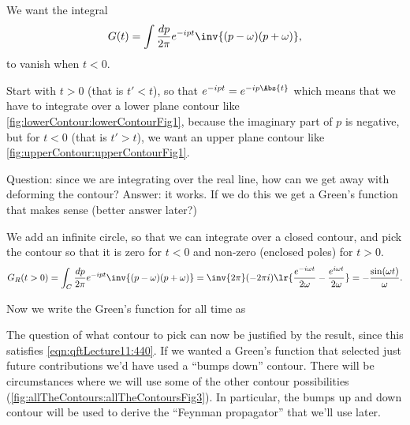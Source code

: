 We want the integral
\begin{equation}\label{eqn:qftLecture11:620}
G(t)
= \int \frac{dp}{2 \pi} e^{-i p t}
\inv{(p - \omega)(p + \omega)},
\end{equation}
to vanish when \( t < 0 \).

Start with \( t > 0 \) (that is \( t' < t \)), so that \( e^{-i p t} = e^{-i p \Abs{t}} \) which means that we have to integrate over a lower plane contour like \cref{fig:lowerContour:lowerContourFig1}, because the imaginary part of \( p \) is negative, but for \( t < 0 \) (that is \( t' > t \)), we want an upper plane contour like \cref{fig:upperContour:upperContourFig1}.


Question: since we are integrating over the real line, how can we get away with deforming the contour?
Answer: it works.  If we do this we get a Green's function that makes sense (better answer later?)

We add an infinite circle, so that we can integrate over a closed contour, and pick the contour so that it is zero for \( t < 0 \) and non-zero (enclosed poles) for \( t > 0 \).
\begin{equation}\label{eqn:qftLecture11:640}
G_R(t > 0)
= \int_C \frac{dp}{2 \pi} e^{-i p t}
\inv{(p - \omega)(p + \omega)}
=
\inv{2 \pi} (-2 \pi i) \lr{
   \frac{e^{-i \omega t}}{2 \omega}
   -
   \frac{e^{i \omega t}}{2 \omega}
}
=
-\frac{\sin(\omega t)}{\omega}.
\end{equation}

Now we write the Green's function for all time as

The question of what contour to pick can now be justified by the result, since this satisfies \cref{eqn:qftLecture11:440}.  If we wanted a Green's function that selected just future contributions we'd have used a ``bumps down'' contour.  There will be circumstances where we will use some of the other contour possibilities (\cref{fig:allTheContours:allTheContoursFig3}).  In particular, the bumps up and down contour will be used to derive the ``Feynman propagator'' that we'll use later.

